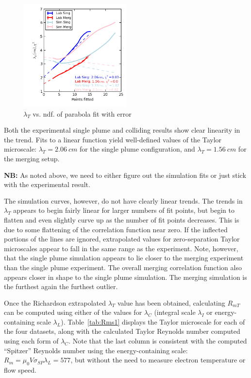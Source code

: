 \documentclass[aip,prl,amsmath,amssymb,reprint,superscriptaddress]{revtex4-1} %
\begin{document}
\begin{figure}[!htbp]
\centerline{
\includegraphics[width=0.5\textwidth]{Images/ndf.png}}
\caption{\label{fig:ndf} $\lambda_T$ vs. ndf. of parabola fit with error}
\end{figure}

Both the experimental single plume and colliding results show clear linearity in the trend. Fits to a linear function yield well-defined values of the Taylor microscale: $\lambda_T = 2.06~cm$ for the single plume configuration, and $\lambda_T = 1.56~cm$ for the merging setup. 

{\bf NB:} As noted above, we need to either figure out the simulation fits or just stick with the experimental result.

The simulation curves, however, do not have clearly linear trends. The trends in $\lambda_{T}$ appears to begin fairly linear for larger numbers of fit points, but begin to flatten and even slightly curve up as the number of fit points decreases. This is due to some flattening of the correlation function near zero. If the inflected portions of the lines are ignored, extrapolated values for zero-separation Taylor microscales appear to fall in the same range as the experiment. Note, however, that the single plume simulation appears to lie closer to the merging experiment than the single plume experiment. The overall merging correlation function also appears closer in shape to the single plume simulation. The merging simulation is the furthest again the furthest outlier.

Once the Richardson extrapolated $\lambda_T$ value has been obtained, calculating $R_{mT}$ can be computed using either of the values for $\lambda_{C}$ (integral scale $\lambda_{I}$ or energy-containing scale $\lambda_L$). Table~\ref{tab:Rms1} displays the Taylor microscale for each of the four datasets, along with the calculated Taylor Reynolds number computed using each form of $\lambda_{C}$. Note that the last column is consistent with the computed ``Spitzer'' Reynolds number using the energy-containing scale: $R_m = \mu_0 V \sigma_{SP} \lambda_L = 577$, but without the need to measure electron temperature or flow speed.
\end{document}
